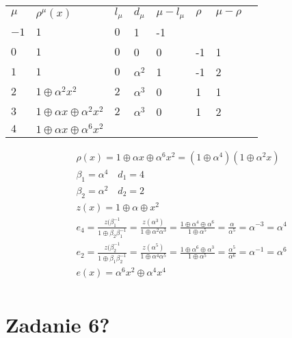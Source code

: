 \documentclass[12pt]{article}
\begin{document}
\begin{table}[h]
    \begin{tabular}{l|llllll}
        $\mu $ & $\rho^{\mu}(x)$                    & $l_\mu$ & $d_\mu$    & $\mu - l_\mu$ & $\rho$ & $\mu - \rho $ & \hline \\
        $-1$   & $1$                                & $0$     & 1          &  -1           &        &               & \\
        $0$    & $1$                                & $0$     & 0          &   0           &  -1    &  1            & \\
        $1$    & $1$                                & $0$     & $\alpha^2$ &   1           &  -1    &  2            & \\
        $2$    & $1\oplus \alpha^2x^2$              & $2$     & $\alpha^3$ &   0           &   1    &  1            & \\
        $3$    & $1\oplus\alpha x\oplus \alpha^2x^2$& $2$     & $\alpha^3$ &   0           &   1    &  2            & \\
        $4$    & $1\oplus\alpha x\oplus \alpha^6x^2$&      &  &              &       &              & \\
    \end{tabular}
    
\end{table}
\begin{align}
    & \rho(x) = 1 \oplus \alpha x \oplus \alpha^6 x^2 = (1\oplus \alpha^4)(1\oplus \alpha^2x) \\
    & \beta_1 = \alpha^4 \quad d_1=4 \\
    & \beta_2 = \alpha^2 \quad d_2=2 \\
    & z(x) = 1\oplus \alpha \oplus x^2 \\ 
    & e_4 = \frac{z(\beta_1^{-1}}{1\oplus \beta_2 \beta_1^{-1}} =
        \frac{z(\alpha^3)}{1\oplus \alpha^2 \alpha^3} = \frac{1\oplus \alpha^4 \oplus \alpha^6 }{1 \oplus \alpha^5} 
        = \frac{\alpha}{\alpha^5} = \alpha^{-3} = \alpha^4 \\
    & e_2 = \frac{z(\beta_2^{-1}}{1\oplus \beta_1 \beta_2^{-1}} =
        \frac{z(\alpha^5)}{1\oplus \alpha^4 \alpha^5} = \frac{1\oplus \alpha^6 \oplus \alpha^3 }{1 \oplus \alpha^5} 
        = \frac{\alpha^5}{\alpha^6} = \alpha^{-1} = \alpha^6 \\
    & e(x) = \alpha^6 x^2 \oplus \alpha^4 x^4 \\
\end{align}

\section*{Zadanie 6?}
\end{document}
